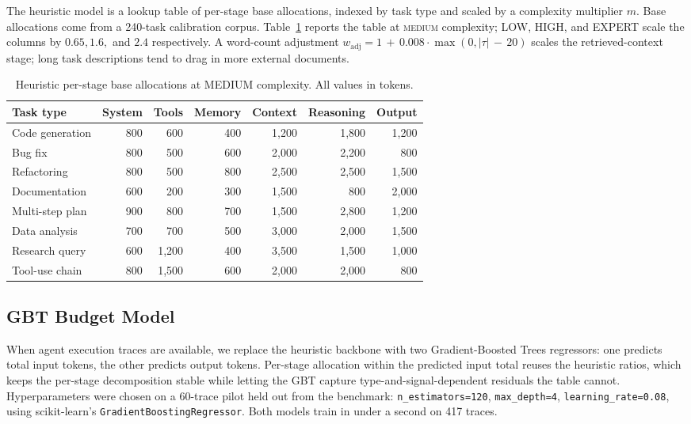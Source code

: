 \documentclass{article}
\newcommand{\code}[1]{\texttt{\small #1}}
\begin{document}
The heuristic model is a lookup table of per-stage base allocations,
indexed by task type and scaled by a complexity multiplier $m$. Base
allocations come from a 240-task calibration corpus.
Table~\ref{tab:base-alloc} reports the table at
\textsc{medium} complexity; LOW, HIGH, and EXPERT scale the columns
by $0.65, 1.6,$ and $2.4$ respectively. A word-count adjustment
$w_{\text{adj}} = 1\,{+}\,0.008\cdot\max(0,|\tau|\,{-}\,20)$ scales the
retrieved-context stage; long task descriptions tend to drag in more
external documents.

\begin{table}[h]
  \caption{Heuristic per-stage base allocations at MEDIUM complexity. All
  values in tokens.}
  \label{tab:base-alloc}
  \centering
  \small
  \begin{tabular}{lrrrrrr}
    \toprule
    Task type & System & Tools & Memory & Context & Reasoning & Output \\
    \midrule
    Code generation & 800 &   600 & 400 & 1{,}200 & 1{,}800 & 1{,}200 \\
    Bug fix         & 800 &   500 & 600 & 2{,}000 & 2{,}200 &    800  \\
    Refactoring     & 800 &   500 & 800 & 2{,}500 & 2{,}500 & 1{,}500 \\
    Documentation   & 600 &   200 & 300 & 1{,}500 &    800  & 2{,}000 \\
    Multi-step plan & 900 &   800 & 700 & 1{,}500 & 2{,}800 & 1{,}200 \\
    Data analysis   & 700 &   700 & 500 & 3{,}000 & 2{,}000 & 1{,}500 \\
    Research query  & 600 & 1{,}200 & 400 & 3{,}500 & 1{,}500 & 1{,}000 \\
    Tool-use chain  & 800 & 1{,}500 & 600 & 2{,}000 & 2{,}000 &    800  \\
    \bottomrule
  \end{tabular}
\end{table}

\subsection{GBT Budget Model}

When agent execution traces are available, we replace the heuristic
backbone with two Gradient-Boosted Trees regressors: one predicts total
input tokens, the other predicts output tokens. Per-stage allocation
within the predicted input total reuses the heuristic ratios, which keeps
the per-stage decomposition stable while letting the GBT capture
type-and-signal-dependent residuals the table cannot. Hyperparameters
were chosen on a 60-trace pilot held out from the benchmark:
\code{n\_estimators=120}, \code{max\_depth=4},
\code{learning\_rate=0.08}, using scikit-learn's
\code{GradientBoostingRegressor}. Both models train in under a second on
417 traces.
\end{document}
